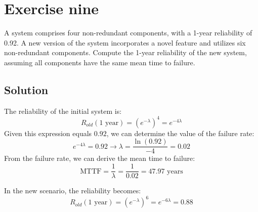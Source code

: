\section{Exercise nine}

A system comprises four non-redundant components, with a 1-year reliability of 0.92.
A new version of the system incorporates a novel feature and utilizes six non-redundant components.
Compute the 1-year reliability of the new system, assuming all components have the same mean time to failure.

\subsection*{Solution}
The reliability of the initial system is:
\[R_{old}(1 \text{ year})=\left(e^{-\lambda}\right)^4=e^{-4\lambda}\]
Given this expression equals $0.92$, we can determine the value of the failure rate:
\[e^{-4\lambda}=0.92\rightarrow \lambda=\dfrac{\ln(0.92)}{-4}=0.02\]
From the failure rate, we can derive the mean time to failure:
\[\text{MTTF}=\dfrac{1}{\lambda}=\dfrac{1}{0.02}=47.97\text{ years}\]

In the new scenario, the reliability becomes:
\[R_{old}(1 \text{ year})=\left(e^{-\lambda}\right)^6=e^{-6\lambda}=0.88\]